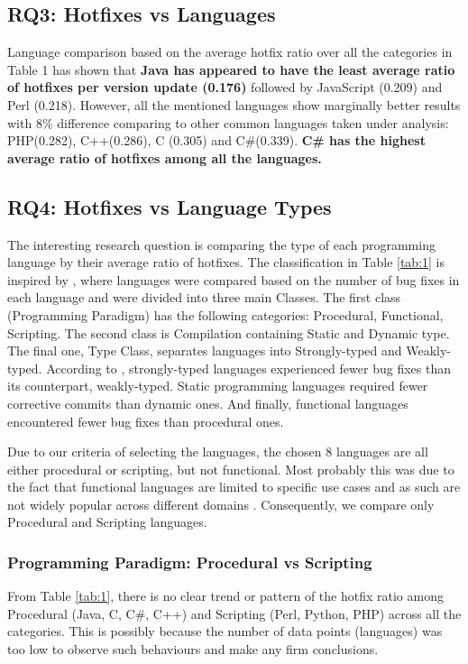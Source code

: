 \documentclass{sig-alternate}
\begin{document}
\subsection{RQ3: Hotfixes vs Languages}
Language comparison based on the average hotfix ratio over all the categories in Table 1 has shown that \textbf{Java has appeared to have the least average ratio of hotfixes per version update (0.176)} followed by JavaScript (0.209) and Perl (0.218). However, all the mentioned languages show marginally better results with 8\% difference comparing to other common languages taken under analysis: PHP(0.282), C++(0.286), C (0.305) and C\#(0.339). \textbf{C\# has the highest average ratio of hotfixes among all the languages.}

\subsection{RQ4: Hotfixes vs Language Types}
The interesting research question is comparing the type of each programming language by their average ratio of hotfixes. The classification in Table \ref{tab:1} is inspired by \cite{Ray2014}, where languages were compared based on the number of bug fixes in each language and were divided into three main Classes. The first class (Programming Paradigm) has the following categories: Procedural, Functional, Scripting. The second class is Compilation containing Static and Dynamic type. The final one, Type Class, separates languages into Strongly-typed and Weakly-typed. According to \cite{Ray2014}, strongly-typed languages experienced fewer bug fixes than its counterpart, weakly-typed. Static programming languages required fewer corrective commits than dynamic ones. And finally, functional languages encountered fewer bug fixes than procedural ones.

Due to our criteria of selecting the languages, the chosen 8 languages are all either procedural or scripting, but not functional. Most probably this was due to the fact that functional languages are limited to specific use cases and as such are not widely popular across different domains  \cite{Wadler1999}. Consequently, we compare only Procedural and Scripting languages.

\subsubsection*{Programming Paradigm: Procedural vs Scripting}
From Table \ref{tab:1}, there is no clear trend or pattern of the hotfix ratio among Procedural (Java, C, C\#, C++) and Scripting (Perl, Python, PHP) across all the categories. This is possibly because the number of data points (languages) was too low to observe such behaviours and make any firm conclusions. %
\end{document}
